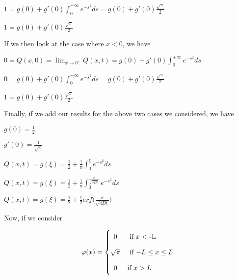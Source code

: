 \documentclass[executivepaper]{article}
\begin{document}
\begin{flushleft}
\begin{center}
$1=g(0)+g'(0) \int_{0}^{+\infty} e^{-s^{2}} ds=g(0)+g'(0) \frac{\sqrt{\pi}}{2}$

\vspace{2mm}

$1=g(0)+g'(0) \frac{\sqrt{\pi}}{2}$

\vspace{5mm}

If we then look at the case where $x < 0$, we have

\vspace{2mm}

$0=Q(x,0)=\lim_{x \to 0^{-}} Q(x,t)=g(0)+g'(0) \int_{0}^{+\infty} e^{-s^{2}} ds$

$0=g(0)+g'(0) \int_{0}^{+\infty} e^{-s^{2}} ds=g(0)+g'(0) \frac{\sqrt{\pi}}{2}$

\vspace{2mm}

$1=g(0)+g'(0) \frac{\sqrt{\pi}}{2}$

\vspace{5mm}

Finally, if we add our results for the above two cases we considered, we have

\vspace{2mm}

$g(0)=\frac{1}{2}$

\vspace{1mm}

$g'(0)=\frac{1}{\sqrt{\pi}}$

\vspace{2mm}

$Q(x,t)=g(\xi)=\frac{1}{2}+\frac{1}{\pi} \int_{0}^{\xi} e^{-s^{2}} ds$

\vspace{2mm}

$Q(x,t)=g(\xi)=\frac{1}{2}+\frac{1}{\pi} \int_{0}^{\frac{x}{\sqrt{4Dt}}} e^{-s^{2}} ds$

\vspace{2mm}

$Q(x,t)=g(\xi)=\frac{1}{2}+\frac{1}{2} {erf} \bigg(\frac{x}{\sqrt{4Dt}}\bigg)$

\end{center}

\vspace {5mm}

Now, if we consider

\begin{center}

\[
 \varphi(x)=
  \begin{cases} 
      \hfill 0    \hfill & \text{ if $x <$ -L} \\[2ex]
      \hfill \sqrt{\pi} \hfill & \text{ if $-L \leq x \leq L$} \\[2ex]
      \hfill 0     \hfill & \text{if $x > L$}
  \end{cases}
\]


\end{center}
\end{flushleft}
\end{document}
